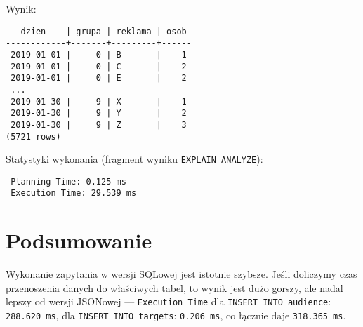 \documentclass[a4paper,11pt]{article}
\begin{document}
Wynik:
\begin{lstlisting}
   dzien    | grupa | reklama | osob 
------------+-------+---------+------
 2019-01-01 |     0 | B       |    1
 2019-01-01 |     0 | C       |    2
 2019-01-01 |     0 | E       |    2
 ...
 2019-01-30 |     9 | X       |    1
 2019-01-30 |     9 | Y       |    2
 2019-01-30 |     9 | Z       |    3
(5721 rows)
\end{lstlisting}
Statystyki wykonania (fragment wyniku \texttt{EXPLAIN ANALYZE}):
\begin{lstlisting}
 Planning Time: 0.125 ms
 Execution Time: 29.539 ms
\end{lstlisting}


\section{Podsumowanie}

Wykonanie zapytania w wersji SQLowej jest istotnie szybsze. Jeśli doliczymy czas przenoszenia danych do właściwych tabel,
to wynik jest dużo gorszy, ale nadal lepszy od wersji JSONowej ---
\texttt{Execution Time} dla \texttt{INSERT INTO audience}: \texttt{288.620 ms}, dla \texttt{INSERT INTO targets}: \texttt{0.206 ms},
co łącznie daje \texttt{318.365 ms}.
\end{document}
